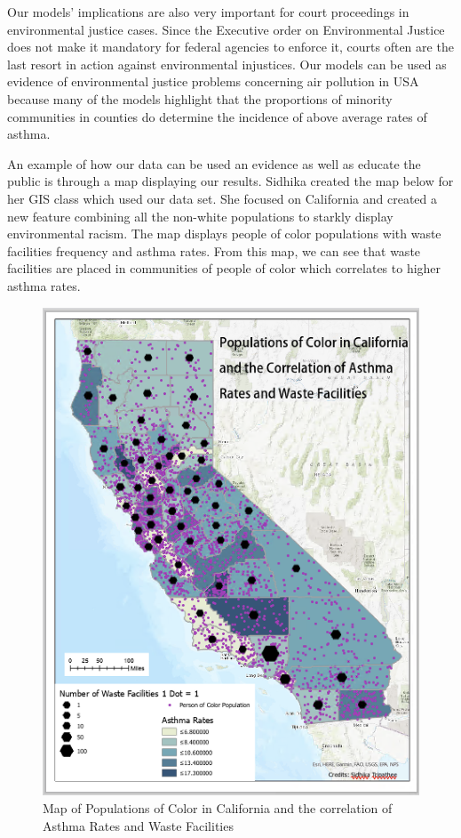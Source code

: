 \documentclass{article}
\begin{document}
Our models' implications are also very important for court proceedings in environmental justice cases. Since the Executive order on Environmental Justice does not make it mandatory for federal agencies to enforce it, courts often are the last resort in action against environmental injustices. Our models can be used as evidence of environmental justice problems concerning air pollution in USA because many of the models highlight that the proportions of minority communities in counties do determine the incidence of above average rates of asthma. 

An example of how our data can be used an evidence as well as educate the public is through a map displaying our results. Sidhika created the map below for her GIS class which used our data set. She focused on California and created a new feature combining all the non-white populations to starkly display environmental racism. The map  displays people of color populations with waste facilities frequency and asthma rates. From this map, we can see that waste facilities are placed in communities of people of color which correlates to higher asthma rates. 

\begin{figure}[h]
\caption{Map of Populations of Color in California and the correlation of Asthma Rates and Waste Facilities}
\includegraphics[scale=0.50]{Map.png}
\end{figure}
\end{document}
